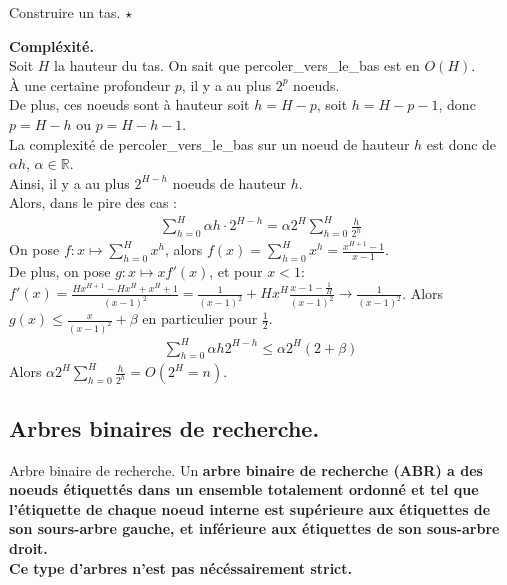 \documentclass[french, 11pt]{article}
\begin{document}
\begin{defi}{Construire un tas. $\star$}{}
    \begin{algorithm}[H]
        \LinesNumbered
        \caption{Construire un tas}
    \end{algorithm}
    \textbf{Compléxité.}\\
    Soit $H$ la hauteur du tas. On sait que percoler\_vers\_le\_bas est en $O(H)$.\\
    À une certaine profondeur $p$, il y a au plus $2^p$ noeuds.\\
    De plus, ces noeuds sont à hauteur soit $h=H-p$, soit $h=H-p-1$, donc $p=H-h$ ou $p=H-h-1$.\\
    La complexité de percoler\_vers\_le\_bas sur un noeud de hauteur $h$ est donc de $\alpha h$, $\alpha\in\mathbb{R}$.\\
    Ainsi, il y a au plus $2^{H-h}$ noeuds de hauteur $h$.\\
    Alors, dans le pire des cas :
    \begin{align*}
        \sum_{h=0}^{H}{\alpha h\cdot2^{H-h}}=\alpha2^H\sum_{h=0}^{H}{\frac{h}{2^h}}
    \end{align*}
    On pose $f:x\mapsto\sum\limits_{h=0}^Hx^h$, alors $f(x)=\sum\limits_{h=0}^Hx^h=\frac{x^{H+1}-1}{x-1}$.\\
    De plus, on pose $g:x\mapsto xf'(x)$, et pour $x<1$: $f'(x)=\frac{Hx^{H+1}-Hx^{H}+x^{H}+1}{(x-1)^2}=\frac{1}{(x-1)^2}+Hx^H\frac{x - 1 - \frac{1}{H}}{(x-1)^2}\to\frac{1}{(x-1)^2}$.
    Alors $g(x)\leq\frac{x}{(x-1)^2}+\beta$ en particulier pour $\frac{1}{2}$.
    \begin{align*}
        \sum_{h=0}^H\alpha h 2^{H-h}\leq\alpha2^{H}(2+\beta)
    \end{align*}
    Alors $\alpha2^H\sum_{h=0}^H\frac{h}{2^h} = O(2^H = n)$.
\end{defi}

\subsection{Arbres binaires de recherche.}

\begin{defi}{Arbre binaire de recherche.}{}
    Un \bf{arbre binaire de recherche (ABR)} a des noeuds étiquettés dans un ensemble totalement ordonné et tel que l'étiquette de chaque noeud interne est supérieure aux étiquettes de son sours-arbre gauche, et inférieure aux étiquettes de son sous-arbre droit.\\
    Ce type d'arbres n'est pas nécéssairement strict.
\end{defi}
\end{document}
